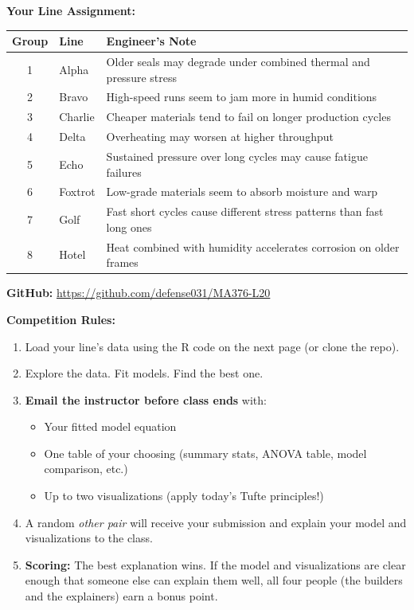 \documentclass[12pt]{article}
\begin{document}
\vspace{0.3cm}

\noindent
\textbf{Your Line Assignment:}

\begingroup
\setlength{\tabcolsep}{4pt}
\renewcommand{\arraystretch}{1.3}
\begin{table}[ht]
\centering
\begin{tabularx}{0.95\textwidth}{|c|l|X|}
    \hline
    \textbf{Group} & \textbf{Line} & \textbf{Engineer's Note} \\ \hline
    1 & Alpha & Older seals may degrade under combined thermal and pressure stress \\ \hline
    2 & Bravo & High-speed runs seem to jam more in humid conditions \\ \hline
    3 & Charlie & Cheaper materials tend to fail on longer production cycles \\ \hline
    4 & Delta & Overheating may worsen at higher throughput \\ \hline
    5 & Echo & Sustained pressure over long cycles may cause fatigue failures \\ \hline
    6 & Foxtrot & Low-grade materials seem to absorb moisture and warp \\ \hline
    7 & Golf & Fast short cycles cause different stress patterns than fast long ones \\ \hline
    8 & Hotel & Heat combined with humidity accelerates corrosion on older frames \\ \hline
\end{tabularx}
\end{table}
\endgroup

\newpage

\noindent
\textbf{GitHub:} \url{https://github.com/defense031/MA376-L20}

\vspace{0.2cm}

\noindent
\textbf{Competition Rules:}

\begin{enumerate}
    \item Load your line's data using the R code on the next page (or clone the repo).
    \item Explore the data. Fit models. Find the best one.
    \item \textbf{Email the instructor before class ends} with:
    \begin{itemize}
        \item Your fitted model equation
        \item One table of your choosing (summary stats, ANOVA table, model comparison, etc.)
        \item Up to two visualizations (apply today's Tufte principles!)
    \end{itemize}
    \item A random \textit{other pair} will receive your submission and explain your model and visualizations to the class.
    \item \textbf{Scoring:} The best explanation wins. If the model and visualizations are clear enough that someone else can explain them well, all four people (the builders and the explainers) earn a bonus point.
\end{enumerate}
\end{document}
